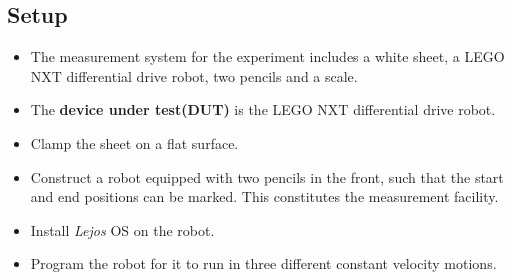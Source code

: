 \documentclass[11pt,a4paper,titlepage]{article}
\begin{document}
\subsection{\textbf{Setup}}
\begin{itemize}
\item The measurement system for the experiment includes a white sheet, a LEGO NXT differential drive robot, two pencils and a scale.
\item The \textbf{device under test(DUT)} is the LEGO NXT differential drive robot.
\item Clamp the sheet on a flat surface.
\item Construct a robot equipped with two pencils in the front, such that the start and end positions can be marked. This constitutes the measurement facility.
\item Install \textit{Lejos} OS on the robot.
\item Program the robot for it to run in three different constant velocity motions.
\end{itemize}
\end{document}
